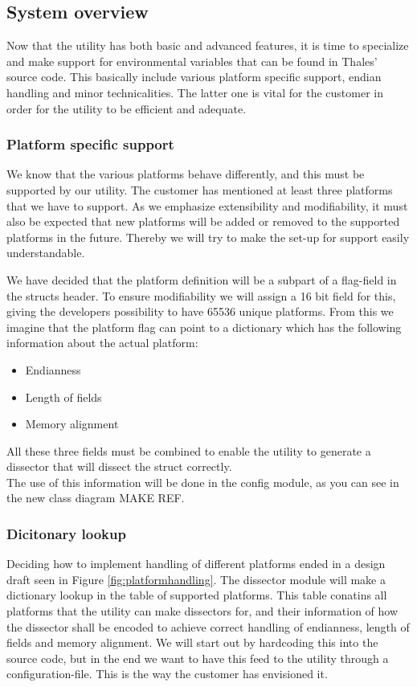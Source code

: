 \subsection{System overview}
Now that the \gls{utility} has both basic and advanced features, it is time to specialize and make support for environmental variables that can be found in Thales' source code. This basically include various platform specific support, \gls{endian} handling and minor technicalities. The latter one is vital for the customer in order for the \gls{utility} to be efficient and adequate.

\subsubsection{Platform specific support}
We know that the various platforms behave differently, and this must be supported by our \gls{utility}. The customer has mentioned at least three platforms that we have to support. As we emphasize extensibility and modifiability, it must also be expected that new platforms will be added or removed to the supported platforms in the future. Thereby we will try to make the set-up for support easily understandable.

We have decided that the platform definition will be a subpart of a flag-field in the structs header. To ensure modifiability we will assign a 16 bit field for this, giving the developers possibility to have 65536 unique platforms. From this we imagine that the platform flag can point to a dictionary which has the following information about the actual platform:
\begin{itemize}
\item Endianness
\item Length of fields
\item Memory alignment
\end{itemize}
All these three fields must be combined to enable the utility to generate a \gls{dissector} that will dissect the struct correctly.\\

The use of this information will be done in the config module, as you can see in the new class diagram MAKE REF.

\subsubsection{Dicitonary lookup}
Deciding how to implement handling of different platforms ended in a design draft seen in Figure \autoref{fig:platformhandling}. The \gls{dissector} module will make a dictionary lookup in the table of supported platforms. This table conatins all platforms that the \gls{utility} can make \glspl{dissector} for, and their information of how the \gls{dissector} shall be encoded to achieve correct handling of \gls{endianness}, length of fields and memory alignment.
We will start out by hardcoding this into the source code, but in the end we want to have this feed to the \gls{utility} through a configuration-file. This is the way the customer has envisioned it.  

